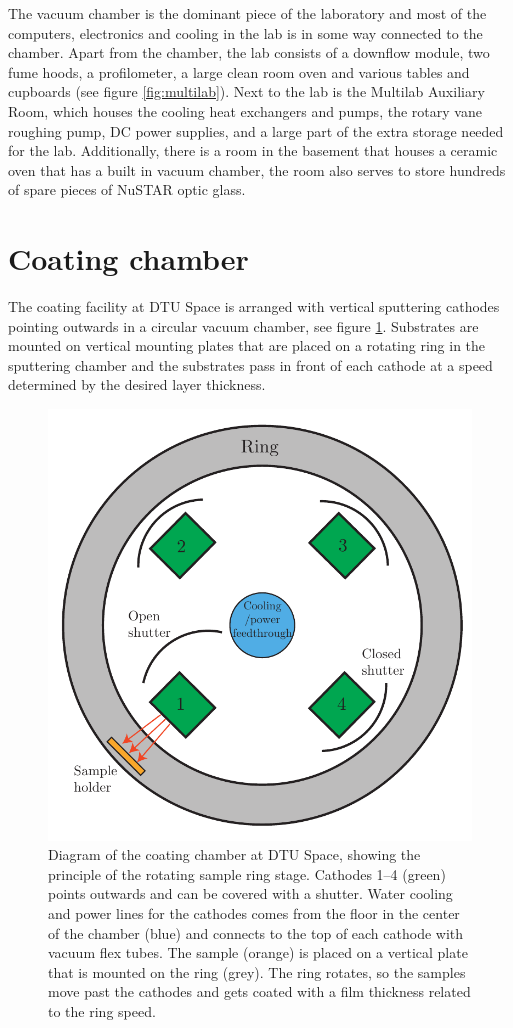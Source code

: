 The vacuum chamber is the dominant piece of the laboratory and most of the computers, electronics and cooling in the lab is in some way connected to the chamber. Apart from the chamber, the lab consists of a downflow module, two fume hoods, a profilometer, a large clean room oven and various tables and cupboards (see figure \ref{fig:multilab}). Next to the lab is the Multilab Auxiliary Room, which houses the cooling heat exchangers and pumps, the rotary vane roughing pump, DC power supplies, and a large part of the extra storage needed for the lab. Additionally, there is a room in the basement that houses a ceramic oven that has a built in vacuum chamber, the room also serves to store hundreds of spare pieces of NuSTAR optic glass.

\section{Coating chamber}
The coating facility at DTU Space is arranged with vertical sputtering cathodes pointing outwards in a circular vacuum chamber, see figure \ref{fig:chamber}. Substrates are mounted on vertical mounting plates that are placed on a rotating ring in the sputtering chamber and the substrates pass in front of each cathode at a speed determined by the desired layer thickness.

\begin{figure}[htbp]
  \centering  \includegraphics[width=0.5\linewidth]{figures/chamber/chamber.pdf}
  \caption{\footnotesize Diagram of the coating chamber at DTU Space, showing the principle of the rotating sample ring stage. Cathodes 1--4 (green) points outwards and can be covered with a shutter. Water cooling and power lines for the cathodes comes from the floor in the center of the chamber (blue) and connects to the top of each cathode with vacuum flex tubes. The sample (orange) is placed on a vertical plate that is mounted on the ring (grey). The ring rotates, so the samples move past the cathodes and gets coated with a film thickness related to the ring speed.}
  \label{fig:chamber}
\end{figure}

